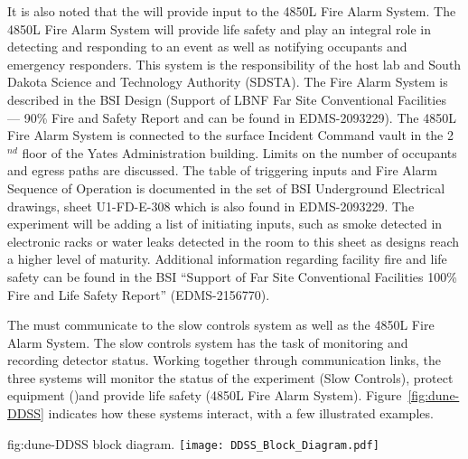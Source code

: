 It is also noted that the  will provide input to the 4850L
Fire Alarm System.  The 4850L Fire Alarm System will provide life
safety and play an integral role in detecting and responding to an
event as well as notifying occupants and emergency responders.  This
system is the responsibility of the host lab and South Dakota Science
and Technology Authority (SDSTA).  The Fire Alarm System is described
in the BSI Design (Support of LBNF Far Site Conventional Facilities
--- 90\% Fire and Safety Report and can be found in
EDMS-2093229\cite{bib:cernedms2093229}). The 4850L Fire Alarm System is
connected to the surface Incident Command vault in the 2$^{nd}$ floor of
the Yates Administration building. Limits on the number of occupants
and egress paths are discussed. The table of triggering inputs and
Fire Alarm Sequence of Operation is documented in the set of BSI
Underground Electrical drawings, sheet U1-FD-E-308 which is also found
in EDMS-2093229\cite{bib:cernedms2093229}. The experiment will be
adding a list of initiating inputs, such as smoke detected in
electronic racks or water leaks detected in the  room to this sheet
as designs reach a higher level of maturity.  Additional information
regarding facility fire and life safety can be found in the BSI 
``Support of  Far Site Conventional Facilities 100\% Fire
and Life Safety Report'' (EDMS-2156770).

 
The  must communicate to the  slow controls
system as well as the 4850L Fire Alarm System.  The  slow
controls system has the task of monitoring and recording detector
status.  Working together through communication links, the three
systems will monitor the status of the experiment (Slow Controls),
protect equipment ()and provide life safety (4850L Fire
Alarm System). Figure~\ref{fig:dune-DDSS} indicates how these systems
interact, with a few illustrated examples.
\begin{dunefigure}{fig:dune-DDSS}
  { block diagram.}
  \texttt{[image: DDSS\_Block\_Diagram.pdf]}
\end{dunefigure}


